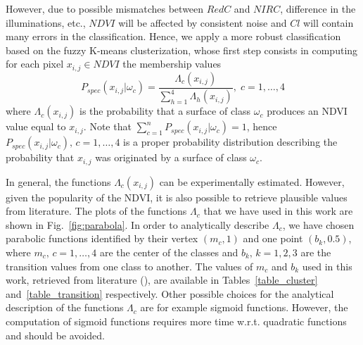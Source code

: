 \documentclass[a4paper, 10pt, conference]{ieeeconf}      %
\begin{document}
However, due to possible mismatches between $RedC$ and $NIRC$, difference in the illuminations, etc., $NDVI$ will be affected by consistent noise and $Cl$ will contain many errors in the classification.
Hence, we apply a more robust classification based on the fuzzy K-means clusterization, whose first step consists in computing for each pixel $x_{i,j} \in NDVI$ the  membership values 
%
\begin{equation}  \label{integral}
P_{spec}(x_{i,j}|\omega_c) =  \frac{\Lambda_c(x_{i,j})}{ 	\sum_{h=1}^4 \Lambda_h(x_{i,j})}, \; c=1, \ldots, 4
\end{equation}
where $\Lambda_c(x_{i,j})$ is the probability that a surface of class $\omega_c$ produces an NDVI value equal to $x_{i,j}$.
Note that $\sum_{c=1}^n P_{spec}(x_{i,j}|\omega_c)=1$, hence $P_{spec}(x_{i,j}|\omega_c), \, c=1, \ldots, 4$ is a proper probability distribution describing the probability that $x_{i,j}$ was originated by a surface of class $\omega_c$. 

In general, the functions $\Lambda_c(x_{i,j})$ can be experimentally estimated.
However, given the popularity of the NDVI, it is also possible to retrieve plausible values from literature.
The plots of the functions $\Lambda_c$ that we have used in this work are shown in Fig.~\ref{fig:parabola}.
In order to analytically describe $\Lambda_c$, we have chosen parabolic functions identified by their vertex $(m_c,1)$ and one point $(b_k,0.5)$, where $m_c, \, c=1,\ldots,4$ are the center of the classes and $b_k, \, k=1,2,3$ are the transition values from one class to another.
The values of $m_c$ and $b_k$ used in this work, retrieved from literature (\cite{2008_PocPar,2009_BaHoGrRi}), are available in Tables~\ref{table_cluster} and~\ref{table_transition} respectively.
Other possible choices for the analytical description of the functions $\Lambda_c$ are for example sigmoid functions.
However, the computation of sigmoid functions requires more time w.r.t. quadratic functions and should be avoided.
\end{document}
